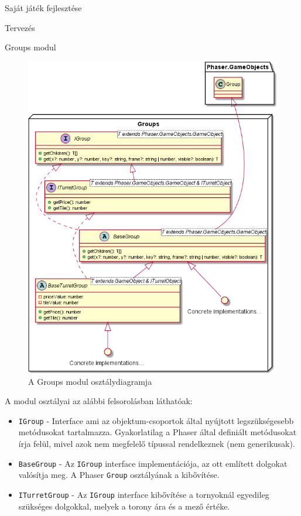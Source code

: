 \begin{MyChapter}{Saját játék fejlesztése}
\begin{MySection}{Tervezés}
\begin{MySubSection}{Groups modul}
			\begin{figure}[h!]
				\centering
				\includegraphics[width=1\textwidth]{kepek/uml/groups/group-pt1.png}
				\caption{A Groups modul osztálydiagramja}
				\label{fig:uml:group}
			\end{figure}
			
			A modul osztályai az alábbi felsorolásban láthatóak:
			\begin{itemize}
				\item \texttt{IGroup} - Interface ami az objektum-csoportok által nyújtott legszükségesebb metódusokat tartalmazza. Gyakorlatilag a Phaser által definiált metódusokat írja felül, mivel azok nem megfelelő típussal rendelkeznek (nem generikusak).
				
				\item \texttt{BaseGroup} - Az \texttt{IGroup} interface implementációja, az ott említett dolgokat valósítja meg. A Phaser \texttt{Group} osztályának a kibővítése.
				
				\item \texttt{ITurretGroup} - Az \texttt{IGroup} interface kibővítése a tornyoknál egyedileg szükséges dolgokkal, melyek a torony ára és a mező értéke.
				

\end{itemize}
\end{MySubSection}
\end{MySection}
\end{MyChapter}
